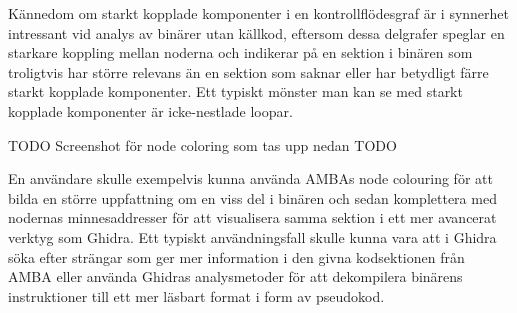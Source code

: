 Kännedom om starkt kopplade komponenter i en kontrollflödesgraf är i synnerhet
intressant vid analys av binärer utan källkod, eftersom dessa delgrafer speglar
en starkare koppling mellan noderna och indikerar på en sektion i binären som
troligtvis har större relevans än en sektion som saknar eller har betydligt
färre starkt kopplade komponenter. Ett typiskt mönster man kan se med starkt
kopplade komponenter är icke-nestlade loopar.

TODO Screenshot för node coloring som tas upp nedan TODO

En användare skulle exempelvis kunna använda AMBAs node colouring för att bilda
en större uppfattning om en viss del i binären och sedan komplettera med
nodernas minnesaddresser för att visualisera samma sektion i ett mer avancerat
verktyg som Ghidra. Ett typiskt användningsfall skulle kunna vara att i Ghidra
söka efter strängar som ger mer information i den givna kodsektionen från AMBA
eller använda Ghidras analysmetoder för att dekompilera binärens instruktioner
till ett mer läsbart format i form av pseudokod.

